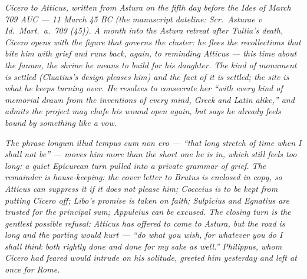 
\textit{Cicero to Atticus, written from Astura on the
fifth day before the Ides of March 709 AUC --- 11
March 45 BC (the manuscript dateline: \textit{Scr.\
Asturae v Id.\ Mart.\ a.\ 709 (45)}). A month into
the Astura retreat after Tullia's death, Cicero
opens with the figure that governs the cluster: he
flees the recollections that bite him with grief
and runs back, again, to reminding Atticus --- this
time about the \textit{fanum}, the shrine he means to
build for his daughter. The kind of monument is
settled (Cluatius's design pleases him) and the fact
of it is settled; the site is what he keeps turning
over. He resolves to consecrate her ``with every
kind of memorial drawn from the inventions of every
mind, Greek and Latin alike,'' and admits the
project may chafe his wound open again, but says he
already feels bound by something like a vow.}

\textit{The phrase \textit{longum illud tempus cum
non ero} --- ``that long stretch of time when I shall
not be'' --- moves him more than the short one he is
in, which still feels too long: a quiet Epicurean
turn pulled into a private grammar of grief. The
remainder is house-keeping: the cover letter to
Brutus is enclosed in copy, so Atticus can suppress
it if it does not please him; Cocceius is to be kept
from putting Cicero off; Libo's promise is taken on
faith; Sulpicius and Egnatius are trusted for the
principal sum; Appuleius can be excused. The
closing turn is the gentlest possible refusal:
Atticus has offered to come to Astura, but the road
is long and the parting would hurt --- ``do what
you wish, for whatever you do I shall think both
rightly done and done for my sake as well.''
Philippus, whom Cicero had feared would intrude on
his solitude, greeted him yesterday and left at once
for Rome.}
